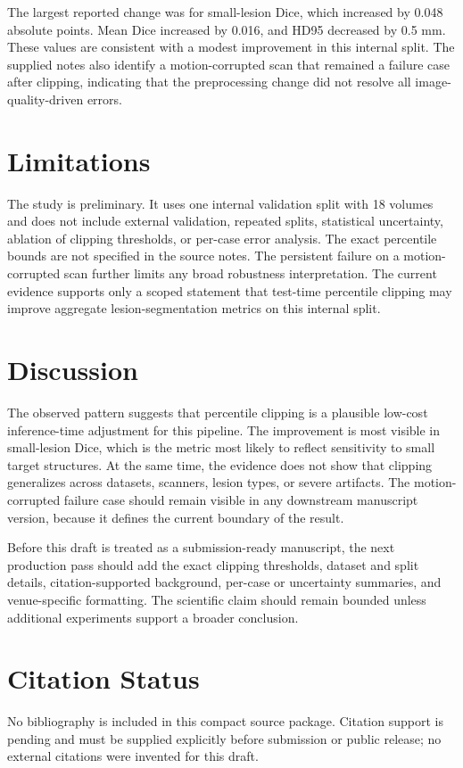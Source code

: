 \documentclass[11pt]{article}
\begin{document}
The largest reported change was for small-lesion Dice, which increased by 0.048 absolute points. Mean Dice increased by 0.016, and HD95 decreased by 0.5 mm. These values are consistent with a modest improvement in this internal split. The supplied notes also identify a motion-corrupted scan that remained a failure case after clipping, indicating that the preprocessing change did not resolve all image-quality-driven errors.

\section{Limitations}

The study is preliminary. It uses one internal validation split with 18 volumes and does not include external validation, repeated splits, statistical uncertainty, ablation of clipping thresholds, or per-case error analysis. The exact percentile bounds are not specified in the source notes. The persistent failure on a motion-corrupted scan further limits any broad robustness interpretation. The current evidence supports only a scoped statement that test-time percentile clipping may improve aggregate lesion-segmentation metrics on this internal split.

\section{Discussion}

The observed pattern suggests that percentile clipping is a plausible low-cost inference-time adjustment for this pipeline. The improvement is most visible in small-lesion Dice, which is the metric most likely to reflect sensitivity to small target structures. At the same time, the evidence does not show that clipping generalizes across datasets, scanners, lesion types, or severe artifacts. The motion-corrupted failure case should remain visible in any downstream manuscript version, because it defines the current boundary of the result.

Before this draft is treated as a submission-ready manuscript, the next production pass should add the exact clipping thresholds, dataset and split details, citation-supported background, per-case or uncertainty summaries, and venue-specific formatting. The scientific claim should remain bounded unless additional experiments support a broader conclusion.

\section*{Citation Status}

No bibliography is included in this compact source package. Citation support is pending and must be supplied explicitly before submission or public release; no external citations were invented for this draft.
\end{document}
